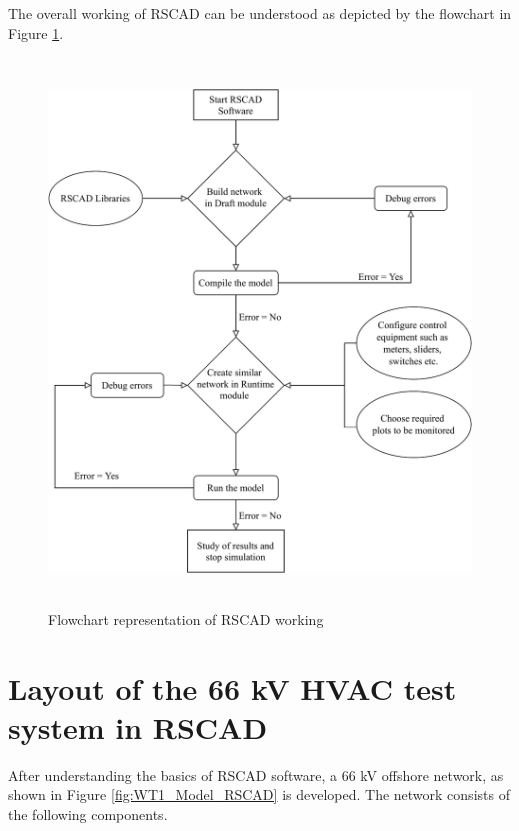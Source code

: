 The overall working of RSCAD can be understood as depicted by the flowchart in Figure \ref{fig:RSCAD_Flowchart}.
\begin{figure}[H]
\centering
    \includegraphics[height = 14.5cm,width = 12.5cm]{Diagrams/Chapter_3/RSCAD_Flowchart.pdf}
    \caption{Flowchart representation of RSCAD working}
    \label{fig:RSCAD_Flowchart}
\end{figure}

\section{Layout of the 66 kV HVAC test system in RSCAD}\label{RSCAD_ACsourcemodel}\label{WT1_ACsource_RSCAD_Test_Layout}
After understanding the basics of RSCAD software, a 66 kV offshore network, as shown in Figure \ref{fig:WT1_Model_RSCAD} is developed. The network consists of the following components.

